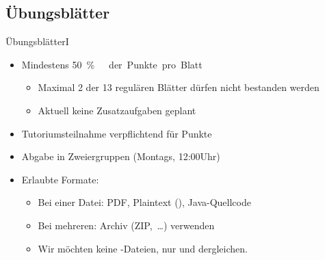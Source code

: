 \subsection{Übungsblätter}
\begin{frame}[t]{Übungsblätter\hfill I}
\begin{itemize}[<+(1)->]
    \item Mindestens \qty{50}\percent\ der Punkte pro Blatt\begin{itemize}
        \itemsep=2.5pt
        \item Maximal 2 der 13 regulären Blätter dürfen nicht bestanden werden
        \item Aktuell keine Zusatzaufgaben geplant\vfill
    \end{itemize}
    \item Tutoriumsteilnahme verpflichtend für Punkte\vfill
    \item Abgabe in Zweiergruppen (Montags, 12:00\;Uhr) \par
    \vfill
    \item<7-> Erlaubte Formate: {\begin{itemize}
        \itemsep=2.5pt
        \item<8-> Bei einer Datei: PDF, Plaintext (), Java-Quellcode
        \item<9-> Bei mehreren: Archiv (ZIP,~\ldots) verwenden
        \item<10-> Wir möchten keine -Dateien, nur  und dergleichen.
    \end{itemize}}\vfill
\end{itemize}
\end{frame}

